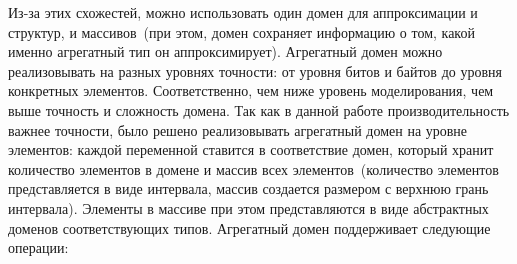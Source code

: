 Из-за этих схожестей, можно использовать один домен для аппроксимации и 
структур, и массивов~(при этом, домен сохраняет информацию о том, какой именно
агрегатный тип он аппроксимирует). Агрегатный домен можно реализовывать на 
разных уровнях точности: от уровня битов и байтов до уровня конкретных элементов. 
Соответственно, чем ниже уровень моделирования, чем выше точность и сложность 
домена. Так как в данной работе производительность важнее точности, было 
решено реализовывать агрегатный домен на уровне элементов: каждой переменной 
ставится в соответствие домен, который хранит количество элементов в домене и 
массив всех элементов~(количество элементов представляется в виде интервала, 
массив создается размером с верхнюю грань интервала). Элементы в массиве при 
этом представляются в виде абстрактных доменов соответствующих типов. 
Агрегатный домен поддерживает следующие операции:
